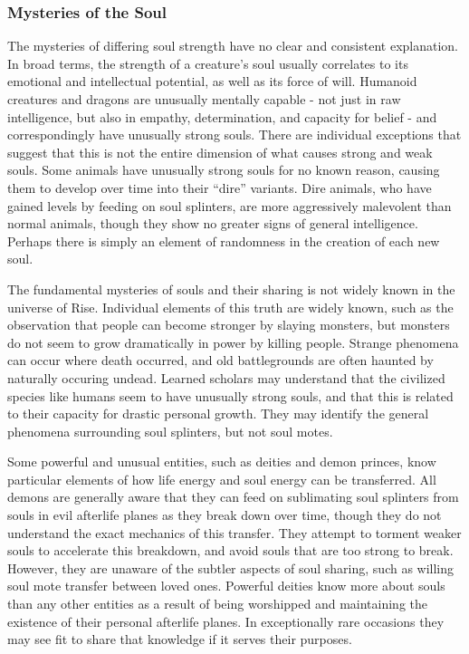     \subsubsection{Mysteries of the Soul}
      The mysteries of differing soul strength have no clear and consistent explanation.
      In broad terms, the strength of a creature's soul usually correlates to its emotional and intellectual potential, as well as its force of will.
      Humanoid creatures and dragons are unusually mentally capable - not just in raw intelligence, but also in empathy, determination, and capacity for belief - and correspondingly have unusually strong souls.
      There are individual exceptions that suggest that this is not the entire dimension of what causes strong and weak souls.
      Some animals have unusually strong souls for no known reason, causing them to develop over time into their ``dire'' variants.
      Dire animals, who have gained levels by feeding on soul splinters, are more aggressively malevolent than normal animals, though they show no greater signs of general intelligence.
      Perhaps there is simply an element of randomness in the creation of each new soul.

      The fundamental mysteries of souls and their sharing is not widely known in the universe of Rise.
      Individual elements of this truth are widely known, such as the observation that people can become stronger by slaying monsters, but monsters do not seem to grow dramatically in power by killing people.
      Strange phenomena can occur where death occurred, and old battlegrounds are often haunted by naturally occuring undead.
      Learned scholars may understand that the civilized species like humans seem to have unusually strong souls, and that this is related to their capacity for drastic personal growth.
      They may identify the general phenomena surrounding soul splinters, but not soul motes.

      Some powerful and unusual entities, such as deities and demon princes, know particular elements of how life energy and soul energy can be transferred.
      All demons are generally aware that they can feed on sublimating soul splinters from souls in evil afterlife planes as they break down over time, though they do not understand the exact mechanics of this transfer.
      They attempt to torment weaker souls to accelerate this breakdown, and avoid souls that are too strong to break.
      However, they are unaware of the subtler aspects of soul sharing, such as willing soul mote transfer between loved ones.
      Powerful deities know more about souls than any other entities as a result of being worshipped and maintaining the existence of their personal afterlife planes.
      In exceptionally rare occasions they may see fit to share that knowledge if it serves their purposes.


